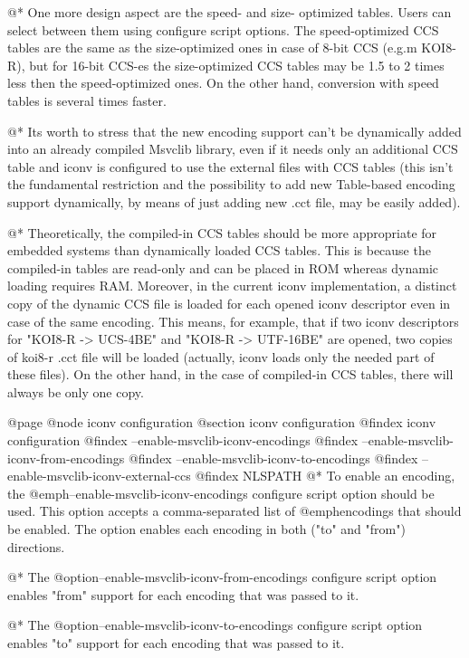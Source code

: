 @*
One more design aspect are the speed- and size- optimized tables. Users can
select between them using configure script options. The
speed-optimized CCS tables are the same as the size-optimized ones in
case of 8-bit CCS (e.g.m KOI8-R), but for 16-bit CCS-es the size-optimized
CCS tables may be 1.5 to 2 times less then the speed-optimized ones. On the
other hand, conversion with speed tables is several times faster.

@*
Its worth to stress that the new encoding support can't be
dynamically added into an already compiled Msvclib library, even if it
needs only an additional CCS table and iconv is configured to use
the external files with CCS tables (this isn't the fundamental restriction
and the possibility to add new Table-based encoding support dynamically, by
means of just adding new .cct file, may be easily added).

@*
Theoretically, the compiled-in CCS tables should be more appropriate for
embedded systems than dynamically loaded CCS tables.  This is because the compiled-in tables are read-only and can be placed in ROM
whereas dynamic loading requires RAM.  Moreover, in the current iconv
implementation, a distinct copy of the dynamic CCS file is loaded for each opened iconv descriptor even in case of the same encoding.
This means, for example, that if two iconv descriptors for
"KOI8-R -> UCS-4BE" and "KOI8-R -> UTF-16BE" are opened, two copies of
koi8-r .cct file will be loaded (actually, iconv loads only the needed part
of these files).  On the other hand, in the case of compiled-in CCS tables, there will always be only one copy.

@page
@node iconv configuration
@section iconv configuration
@findex iconv configuration
@findex --enable-msvclib-iconv-encodings
@findex --enable-msvclib-iconv-from-encodings
@findex --enable-msvclib-iconv-to-encodings
@findex --enable-msvclib-iconv-external-ccs
@findex NLSPATH
@*
To enable an encoding, the @emph{--enable-msvclib-iconv-encodings} configure
script option should be used. This option accepts a comma-separated list
of @emph{encodings} that should be enabled. The option enables each encoding in both
("to" and "from") directions.

@*
The @option{--enable-msvclib-iconv-from-encodings} configure script option enables
"from" support for each encoding that was passed to it.

@*
The @option{--enable-msvclib-iconv-to-encodings} configure script option enables
"to" support for each encoding that was passed to it.

